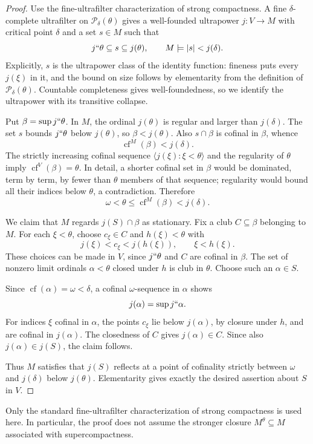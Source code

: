 \documentclass[11pt,letterpaper]{article}
\theoremstyle{definition}
\numberwithin{equation}{section}
\newcommand{\cf}{\operatorname{cf}}
\newcommand{\Pow}{\mathcal P}
\begin{document}
\begin{proof}
Use the fine-ultrafilter characterization of strong compactness. A fine $\delta$-complete ultrafilter on $\Pow_\delta(\theta)$ gives a well-founded ultrapower $j:V\to M$ with critical point $\delta$ and a set $s\in M$ such that
\[
j``\theta\subseteq s\subseteq j(\theta),\qquad
M\models |s|<j(\delta).
\]
Explicitly, $s$ is the ultrapower class of the identity function: fineness puts every $j(\xi)$ in it, and the bound on size follows by elementarity from the definition of $\Pow_\delta(\theta)$. Countable completeness gives well-foundedness, so we identify the ultrapower with its transitive collapse.

Put $\beta=\sup j``\theta$. In $M$, the ordinal $j(\theta)$ is regular and larger than $j(\delta)$. The set $s$ bounds $j``\theta$ below $j(\theta)$, so $\beta<j(\theta)$. Also $s\cap\beta$ is cofinal in $\beta$, whence
\[
\cf^M(\beta)<j(\delta).
\]
The strictly increasing cofinal sequence $\langle j(\xi):\xi<\theta\rangle$ and the regularity of $\theta$ imply $\cf^V(\beta)=\theta$. In detail, a shorter cofinal set in $\beta$ would be dominated, term by term, by fewer than $\theta$ members of that sequence; regularity would bound all their indices below $\theta$, a contradiction. Therefore
\[
\omega<\theta\le\cf^M(\beta)<j(\delta).
\]

We claim that $M$ regards $j(S)\cap\beta$ as stationary. Fix a club $C\subseteq\beta$ belonging to $M$. For each $\xi<\theta$, choose $c_\xi\in C$ and $h(\xi)<\theta$ with
\[
j(\xi)<c_\xi<j(h(\xi)),\qquad \xi<h(\xi).
\]
These choices can be made in $V$, since $j``\theta$ and $C$ are cofinal in $\beta$. The set of nonzero limit ordinals $\alpha<\theta$ closed under $h$ is club in $\theta$. Choose such an $\alpha\in S$.

Since $\cf(\alpha)=\omega<\delta$, a cofinal $\omega$-sequence in $\alpha$ shows
\[
j(\alpha)=\sup j``\alpha.
\]
For indices $\xi$ cofinal in $\alpha$, the points $c_\xi$ lie below $j(\alpha)$, by closure under $h$, and are cofinal in $j(\alpha)$. The closedness of $C$ gives $j(\alpha)\in C$. Since also $j(\alpha)\in j(S)$, the claim follows.

Thus $M$ satisfies that $j(S)$ reflects at a point of cofinality strictly between $\omega$ and $j(\delta)$ below $j(\theta)$. Elementarity gives exactly the desired assertion about $S$ in $V$.
\end{proof}

Only the standard fine-ultrafilter characterization of strong compactness is used here. In particular, the proof does not assume the stronger closure $M^\theta\subseteq M$ associated with supercompactness.
\end{document}
